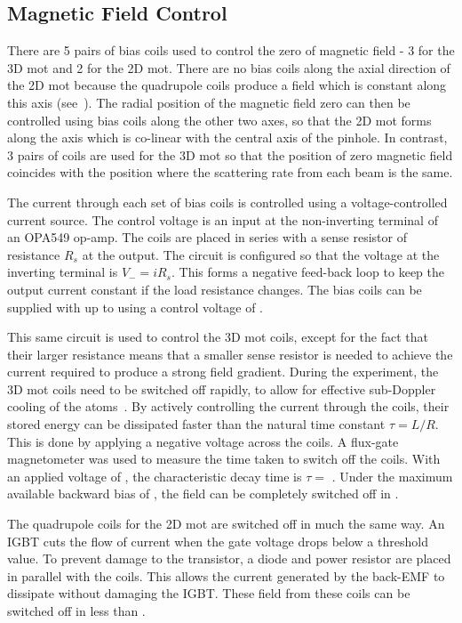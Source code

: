 \subsection{Magnetic Field Control}\label{subsec:coil_control} 
There are 5 pairs of bias coils used to control the zero of magnetic
field - 3 for the 3D \ac{mot} and 2 for the 2D \ac{mot}. There are
no bias coils along the axial direction of the 2D \ac{mot} because
the quadrupole coils produce a field which is constant along this
axis (see~). The radial position of the magnetic field zero can then be
controlled using bias coils along the other two axes, so that the
2D \ac{mot} forms along the axis which is co-linear with the central
axis of the pinhole. In contrast, 3 pairs of coils are used for the 3D
\ac{mot} so that the position of zero magnetic field coincides
with the position where the scattering rate from each beam is the
same. \par\noindent
The current through each set of
bias coils is
controlled using a voltage-controlled current source. The control
voltage is an input at the non-inverting terminal of an OPA549 op-amp.
The coils are placed in series with a sense resistor of resistance
\(R_s\) at the output. The circuit is configured so that the voltage
at the inverting terminal is \(V_- = i R_s\).  This forms a negative
feed-back loop to keep the output current constant if the load
resistance changes. The bias coils can be supplied with up to
 using a control voltage of .
\par\noindent This same circuit is used to control the 3D \ac{mot}
coils, except for the fact that their larger resistance means that a
smaller sense resistor is needed to achieve the current required to produce a strong field
gradient. During the experiment, the 3D \ac{mot} coils need to be
switched off rapidly, to allow for effective sub-Doppler cooling of
the atoms~\cite{Dedman2001}. By actively controlling the current
through the coils, their stored energy can be dissipated faster than
the natural time constant \(\tau = L/R\). This is done by applying a
negative voltage across the coils. A flux-gate magnetometer
was used to measure the time taken to switch off the coils. With an
applied voltage of , the characteristic decay time
is \(\tau = \) . Under the maximum
available backward bias of , the field can be
completely switched off in . \par\noindent
The quadrupole coils for the 2D \ac{mot} are switched off in much the
same way. An IGBT cuts the flow of current when the gate voltage drops
below a threshold value. To prevent damage to the transistor, a diode
and  power resistor are placed in parallel with the
coils. This allows the current generated by the back-EMF to dissipate
without damaging the IGBT. These field from these coils can be
switched off in less than .

